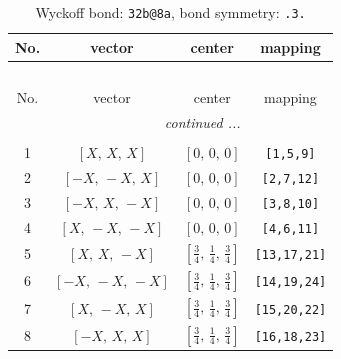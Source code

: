 \documentclass[fleqn,8pt]{jsarticle}
\begin{document}
\begin{longtable}{cccc}
\caption{Wyckoff bond: {\tt 32b@8a}, bond symmetry: {\tt .3.}}
 \\
 \hline \hline
No. & vector & center & mapping \\ \hline \endfirsthead

\multicolumn{3}{l}{\tablename\ \thetable{}} \\
 \hline \hline
No. & vector & center & mapping \\ \hline \endhead

 \hline \hline
\multicolumn{3}{r}{\footnotesize\it continued ...} \\ \endfoot

 \hline \hline
\multicolumn{3}{r}{} \\ \endlastfoot

1 & $\left[ X,\, X,\, X \right]$ & $\left[ 0,\, 0,\, 0 \right]$ & {\tt [1,5,9]} \\ \hline
2 & $\left[ - X,\, - X,\, X \right]$ & $\left[ 0,\, 0,\, 0 \right]$ & {\tt [2,7,12]} \\ \hline
3 & $\left[ - X,\, X,\, - X \right]$ & $\left[ 0,\, 0,\, 0 \right]$ & {\tt [3,8,10]} \\ \hline
4 & $\left[ X,\, - X,\, - X \right]$ & $\left[ 0,\, 0,\, 0 \right]$ & {\tt [4,6,11]} \\ \hline
5 & $\left[ X,\, X,\, - X \right]$ & $\left[ \frac{3}{4},\, \frac{1}{4},\, \frac{3}{4} \right]$ & {\tt [13,17,21]} \\ \hline
6 & $\left[ - X,\, - X,\, - X \right]$ & $\left[ \frac{3}{4},\, \frac{1}{4},\, \frac{3}{4} \right]$ & {\tt [14,19,24]} \\ \hline
7 & $\left[ X,\, - X,\, X \right]$ & $\left[ \frac{3}{4},\, \frac{1}{4},\, \frac{3}{4} \right]$ & {\tt [15,20,22]} \\ \hline
8 & $\left[ - X,\, X,\, X \right]$ & $\left[ \frac{3}{4},\, \frac{1}{4},\, \frac{3}{4} \right]$ & {\tt [16,18,23]} \\
\end{longtable}
\renewcommand{\arraystretch}{1.2}
\end{document}
